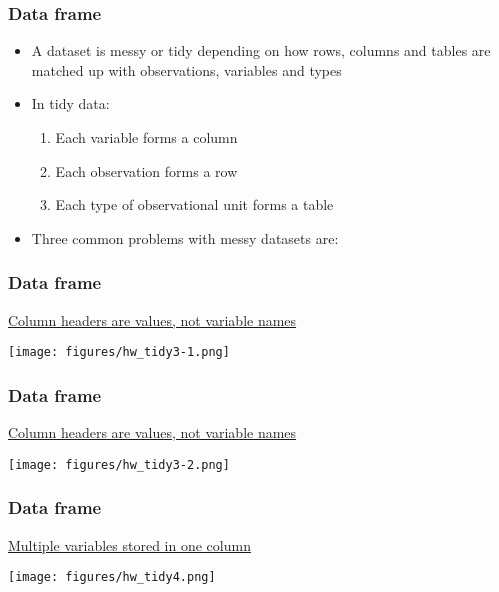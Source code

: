 \documentclass{beamer}
\begin{document}
\begin{frame}[fragile]
	\frametitle{Data frame}
	\begin{itemize}
		\item A dataset is messy or tidy depending on how rows, columns and tables are matched up with observations, variables and types
		\item In tidy data:
			\begin{enumerate}
		\pause
				\item Each variable forms a column
		\pause
				\item Each observation forms a row
		\pause
				\item Each type of observational unit forms a table
			\end{enumerate}
		\pause
		\item Three common problems with messy datasets are:
	\end{itemize}
\end{frame}
\begin{frame}[fragile]
	\frametitle{Data frame}
	\centering \large \underline{Column headers are values, not variable names}
	\vspace{5pt}

	\begin{center} \texttt{[image: figures/hw\_tidy3-1.png]} \end{center}
\end{frame} 
\begin{frame}[fragile]
	\frametitle{Data frame}
	\centering \large \underline{Column headers are values, not variable names}
	\vspace{5pt}

	\begin{center}	\texttt{[image: figures/hw\_tidy3-2.png]} \end{center}
\end{frame} 

\begin{frame}[fragile]
	\frametitle{Data frame}
	\centering \large \underline{Multiple variables stored in one column}
	\vspace{5pt}

	\begin{center} \texttt{[image: figures/hw\_tidy4.png]} \end{center}
\end{frame} 
\end{document}
